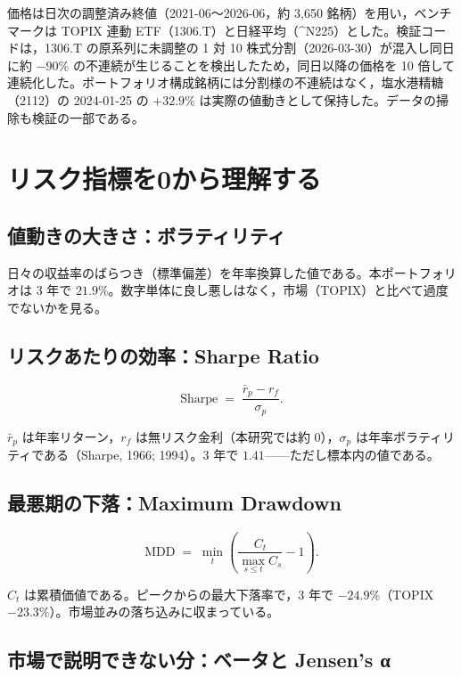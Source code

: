 \documentclass[a4paper,10pt]{article}
\newcommand{\metric}[1]{\mathrm{#1}}
\begin{document}
価格は日次の調整済み終値（2021-06〜2026-06，約 3{,}650 銘柄）を用い，ベンチマークは TOPIX 連動 ETF（1306.T）と日経平均（\^{}N225）とした。検証コードは，1306.T の原系列に未調整の 1 対 10 株式分割（2026-03-30）が混入し同日に約 $-90\%$ の不連続が生じることを検出したため，同日以降の価格を 10 倍して連続化した。ポートフォリオ構成銘柄には分割様の不連続はなく，塩水港精糖（2112）の 2024-01-25 の $+32.9\%$ は実際の値動きとして保持した。データの掃除も検証の一部である。

\section{リスク指標を0から理解する}
\label{sec:risk}

\subsection{値動きの大きさ：ボラティリティ}

日々の収益率のばらつき（標準偏差）を年率換算した値である。本ポートフォリオは 3 年で $21.9\%$。数字単体に良し悪しはなく，市場（TOPIX）と比べて過度でないかを見る。

\subsection{リスクあたりの効率：Sharpe Ratio}

\begin{equation}
\metric{Sharpe} \;=\; \frac{\bar r_p - r_f}{\sigma_p}.
\label{eq:sharpe}
\end{equation}

$\bar r_p$ は年率リターン，$r_f$ は無リスク金利（本研究では約 0），$\sigma_p$ は年率ボラティリティである（Sharpe, 1966; 1994）。3 年で $1.41$——ただし標本内の値である。

\subsection{最悪期の下落：Maximum Drawdown}

\begin{equation}
\metric{MDD} \;=\; \min_{t}\left(\frac{C_t}{\max_{s\le t} C_s}-1\right).
\label{eq:mdd}
\end{equation}

$C_t$ は累積価値である。ピークからの最大下落率で，3 年で $-24.9\%$（TOPIX $-23.3\%$）。市場並みの落ち込みに収まっている。

\subsection{市場で説明できない分：ベータと Jensen's α}
\end{document}
